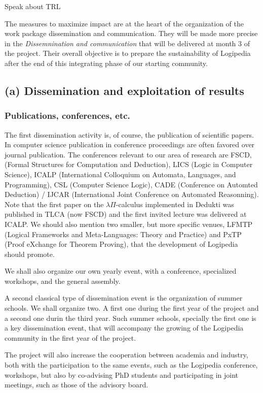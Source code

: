{\color{red} Speak about TRL}

The measures to maximize impact are at the heart of the organization
of the work package dissemination and communication. They will be made
more precise in the {\em Dissemnination and communication} that will
be delivered at month 3 of the project. Their overall objective is to
prepare the sustainability of Logipedia after the end of this
integrating phase of our starting community.

\subsection*{(a) Dissemination and exploitation of results}
\label{sec:dissemination}

\subsubsection*{Publications, conferences, etc.}

The first dissemination activity is, of course, the publication of
scientific papers. In computer science publication in conference
proceedings are often favored over journal publication. The
conferences relevant to our area of research are FSCD, (Formal
Structures for Computation and Deduction), LICS (Logic in Computer
Science), ICALP (International Colloquium on Automata, Languages, and
Programming), CSL (Computer Science Logic), CADE (Conference on
Automted Deduction) / IJCAR (International Joint Conference on
Automated Reasonning). Note that the first paper on the $\lambda
\Pi$-calculus implemented in Dedukti was published in TLCA (now FSCD)
and the first invited lecture was delivered at ICALP. We should also
mention two smaller, but more specific venues, LFMTP (Logical
Frameworks and Meta-Languages: Theory and Practice) and PxTP (Proof
eXchange for Theorem Proving), that the development of Logipedia
should promote.

We shall also organize our own yearly event, with a conference,
specialized workshops, and the general assembly.

A second classical type of dissemination event is the organization of
summer schools. We shall organize two. A first one during the first
year of the project and a second one durin the third year. Such summer
schools, specially the first one is a key dissemination event, that
will accompany the growing of the Logipedia community in the first
year of the project.

The project will also increase the cooperation between academia and
industry, both with the participation to the same events, such as the
Logipedia conference, workshops, but also by co-advising PhD students
and participating in joint meetings, such as those of the advisory
board.

